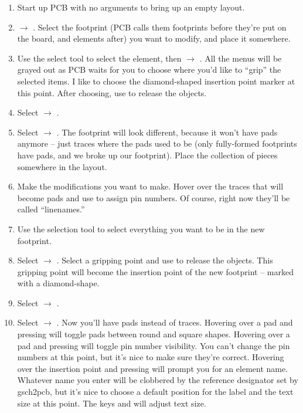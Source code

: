 \begin{enumerate}
\item Start up PCB with no arguments to bring up an empty layout.
\item {} $\rightarrow$ .  Select the footprint (PCB calls them footprints
  before they're put on the board, and elements after) you want to
  modify, and place it somewhere.
\item Use the select tool to select the element, then
   $\rightarrow$ .
  All the menus will be grayed out as PCB waits for you to choose
  where you'd like to ``grip'' the selected items.  I like to choose
  the diamond-shaped insertion point marker at this point.  After
  choosing, use  to release the objects.
\item Select  $\rightarrow$ .
\item Select  $\rightarrow$ .  The footprint will look different, because it won't have
  pads anymore -- just traces where the pads used to be (only
  fully-formed footprints have pads, and we broke up our footprint).
  Place the collection of pieces somewhere in the layout.
\item Make the modifications you want to make.  Hover over the traces
  that will become pads and use  to assign pin numbers.  Of
  course, right now they'll be called ``linenames.''
\item Use the selection tool to select everything you want to be in
  the new footprint.
\item Select  $\rightarrow$ .  Select a gripping point and use  to
  release the objects.  This gripping point will become the insertion
  point of the new footprint -- marked with a diamond-shape.
\item Select  $\rightarrow$ .
\item Select  $\rightarrow$ .  Now you'll have pads instead of traces.  Hovering over a
  pad and pressing  will toggle pads between round and square
  shapes.  Hovering over a pad and pressing  will toggle pin
  number visibility.  You can't change the pin numbers at this point,
  but it's nice to make sure they're correct.  Hovering over the
  insertion point and pressing  will prompt you for an
  element name.  Whatever name you enter will be clobbered by the
  reference designator set by gsch2pcb, but it's nice to choose a
  default position for the label and the text size at this point.  The
  keys  and  will adjust text size.
	

\end{enumerate}
